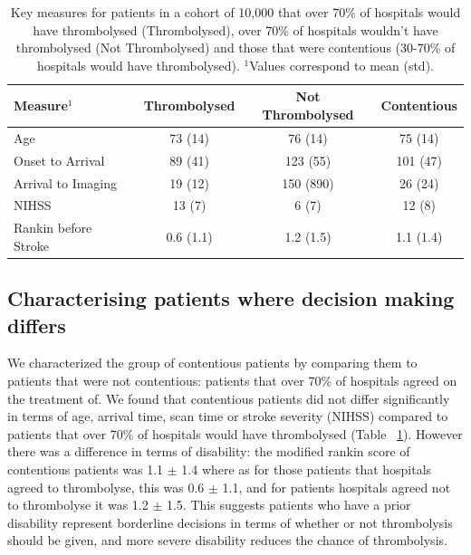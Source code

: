 \documentclass[12pt,a4paper, pdftex]{elsarticle}
\begin{document}
    \begin{table}[h]
        \centering
        \begin{tabular}{|l|c|c|c|}
        \hline
        {\bf Measure$^1$} & {\bf Thrombolysed} & {\bf Not Thrombolysed} & {\bf Contentious}  \\
        \hline
        Age & 73 (14) & 76 (14) & 75 (14) \\
        Onset to Arrival & 89 (41) & 123 (55)  & 101 (47) \\
        Arrival to Imaging & 19 (12) & 150 (890)  & 26 (24) \\
        NIHSS & 13 (7) & 6 (7)  & 12 (8) \\
        Rankin before Stroke & 0.6 (1.1)  & 1.2 (1.5) & 1.1 (1.4) \\
        \hline
        \end{tabular}
        \caption{Key measures for patients in a cohort of 10,000 that over 70\% of hospitals would have thrombolysed (Thrombolysed), over 70\% of hospitals wouldn't have thrombolysed (Not Thrombolysed) and those that were contentious (30-70\% of hospitals would have thrombolysed). $^1$Values correspond to mean (std).}
        \label{tab:3}
    \end{table}


\subsection{Characterising patients where decision making differs}

We characterized the group of contentious patients by comparing them to patients that were not contentious: patients that over 70\% of hospitals agreed on the treatment of. We found that contentious patients did not differ significantly in terms of age, arrival time, scan time or stroke severity (NIHSS) compared to patients that over 70\% of hospitals would have thrombolysed (Table ~\ref{tab:3}). However there was a difference in terms of disability: the modified rankin score of contentious patients was 1.1 $\pm$ 1.4 where as for those patients that hospitals agreed to thrombolyse, this was 0.6 $\pm$ 1.1, and for patients hospitals agreed not to thrombolyse it was 1.2 $\pm$ 1.5. This suggests patients who have a prior disability represent borderline decisions in terms of whether or not thrombolysis should be given, and more severe disability reduces the chance of thrombolysis. 
\end{document}
